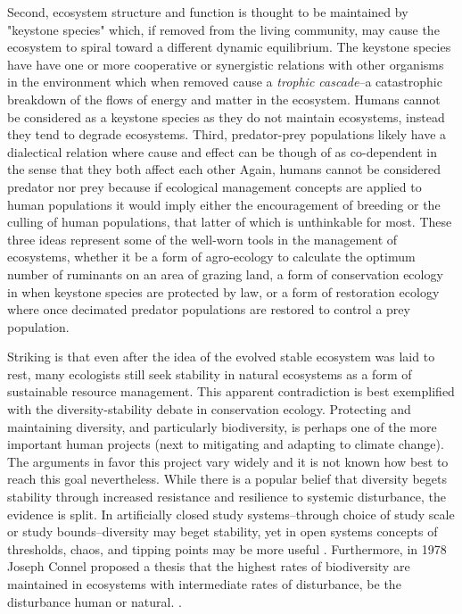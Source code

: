 Second, ecosystem structure and function is thought to be maintained by "keystone species" which, if removed from the living community, may cause the ecosystem to spiral toward a different dynamic equilibrium. The keystone species have have one or more cooperative or synergistic relations with other organisms in the environment which when removed cause a \textit{trophic cascade}--a catastrophic breakdown of the flows of energy and matter in the ecosystem. Humans cannot be considered as a keystone species as they do not maintain ecosystems, instead they tend to degrade ecosystems. Third, predator-prey populations likely have a dialectical relation where cause and effect can be though of as co-dependent in the sense that they both affect each other Again, humans cannot be considered predator nor prey because if ecological management concepts are applied to human populations it would imply either the encouragement of breeding or the culling of human populations, that latter of which is unthinkable for most. These three ideas represent some of the well-worn tools in the management of ecosystems, whether it be a form of agro-ecology to calculate the optimum number of ruminants on an area of grazing land, a form of conservation ecology in when keystone species are protected by law, or a form of restoration ecology where once decimated predator populations are restored to control a prey population. 

Striking is that even after the idea of the evolved stable ecosystem was laid to rest, many ecologists still seek stability in natural ecosystems as a form of sustainable resource management. This apparent contradiction is best exemplified with the diversity-stability debate in conservation ecology. Protecting and maintaining diversity, and particularly biodiversity, is perhaps one of the more important human projects (next to mitigating and adapting to climate change). The arguments in favor this project vary widely and it is not known how best to reach this goal nevertheless. While there is a popular belief that diversity begets stability through increased resistance and resilience to systemic disturbance, the evidence is split. In artificially closed study systems--through choice of study scale or study bounds--diversity may beget stability, yet in open systems concepts of thresholds, chaos, and tipping points may be more useful \citep[for opposing arguments see][]{tilman_1994,goodman_1975}. Furthermore, in 1978 Joseph Connel proposed a thesis that the highest rates of biodiversity are maintained in ecosystems with intermediate rates of disturbance, be the disturbance human or natural. \citep{connel_1978}. 

